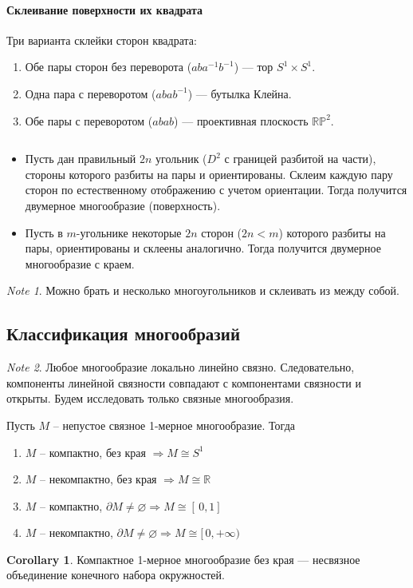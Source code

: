 \documentclass[11pt]{book}
\newcommand{\R}{\mathbb{R}}
\newcommand{\Pm}{\mathbb{P}}
\theoremstyle{definition}
\theoremstyle{plain}
\theoremstyle{plain}
\theoremstyle{definition}
\newtheorem*{cor}{Corollary}
\theoremstyle{remark}
\newtheorem*{note}{Note}
\begin{document}
\paragraph{Склеивание поверхности их квадрата}
Три варианта склейки сторон квадрата:
$ $
\begin{enumerate}
    \item Обе пары сторон без переворота ($ aba^{-1}b^{-1}$) --- тор $ S^{1}\times S^{1}$.
    \item Одна пара с переворотом ($ abab^{-1}$) --- бутылка Клейна.
    \item Обе пары с переворотом ($ abab$) --- проективная плоскость  $ \R\Pm^2$.
\end{enumerate}
\begin{thm}
    $ $
    \begin{itemize}
	\item  Пусть дан правильный $ 2n$ угольник ($ D^{2}$ с границей разбитой на части), стороны которого разбиты на пары и ориентированы.
	    Склеим каждую пару сторон по естественному отображению с учетом ориентации.
	    Тогда получится двумерное многообразие (поверхность).
	\item Пусть в $ m$-угольнике некоторые $ 2n $ сторон ($ 2n < m$) которого разбиты на пары, ориентированы и склеены аналогично.
	    Тогда получится двумерное многообразие с краем.
    \end{itemize}
\end{thm}
\begin{note}
    Можно брать и несколько многоугольников и склеивать из между собой.
\end{note}
\subsection{Классификация многообразий}
\begin{note}
    Любое многообразие локально линейно связно. Следовательно, компоненты линейной связности совпадают с компонентами связности и открыты. Будем исследовать только связные многообразия.
\end{note}
\begin{thm}
    Пусть $ M $ -- непустое связное 1-мерное многообразие. Тогда
    \begin{enumerate}
	\item  $ M$ -- компактно, без края $\Longrightarrow   M \cong S^{1}$
	\item $ M$ -- некомпактно, без края $\Longrightarrow   M \cong \R$
	\item  $ M $ -- компактно, $ \partial M \ne \varnothing \Longrightarrow M \cong [\,0,1]$
	\item $ M$ -- некомпактно, $ \partial M \ne  \varnothing \Longrightarrow M \cong [\,0, +\infty)$
    \end{enumerate}
\end{thm}
\begin{cor}
    Компактное 1-мерное многообразие без края --- несвязное объединение конечного набора окружностей.
\end{cor}
\end{document}
